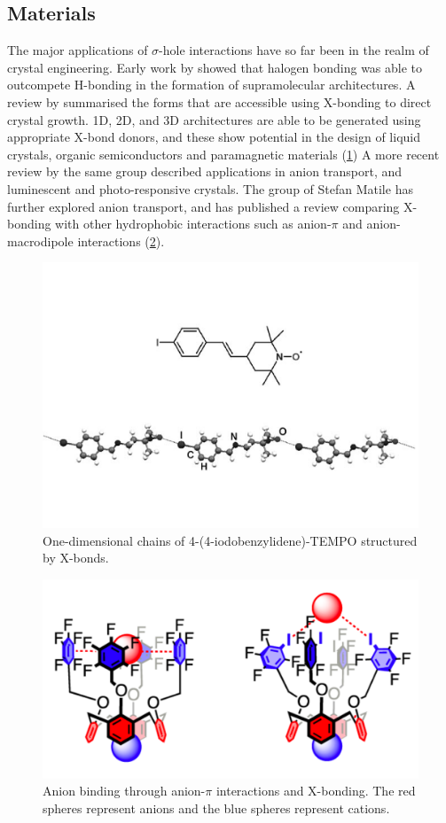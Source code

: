 \begin{refsection}
\subsection{Materials}
The major applications of $ \sigma $-hole interactions have so far been in the realm of crystal engineering.
Early work by \citeauthor{Corradi2000} showed that halogen bonding was able to outcompete H-bonding in the formation of supramolecular architectures.\autocite{Corradi2000}
A review by \citeauthor{Metrangolo2008} summarised the forms that are accessible using X-bonding to direct crystal growth.\autocite{Metrangolo2008}
1D, 2D, and 3D architectures are able to be generated using appropriate X-bond donors, and these show potential in the design of liquid crystals, organic semiconductors and paramagnetic materials (\cref{fig:iodotempo-chains})
A more recent review by the same group described applications in anion transport, and luminescent and photo-responsive crystals.\autocite{Priimagi2013}
The group of Stefan Matile has further explored anion transport, and has published a review comparing X-bonding with other hydrophobic interactions such as anion-$ \pi $ and anion-macrodipole interactions (\cref{fig:matile-anion-binder}).\autocite{VargasJentzsch2013}

\begin{figure}
    \centering
    \includegraphics[width=0.6\linewidth]{Figures/iodotempo-chains.pdf}
    \caption[One-dimensional chains of 4-(4-iodobenzylidene)-TEMPO structured by X-bonds.]{One-dimensional chains of 4-(4-iodobenzylidene)-TEMPO structured by X-bonds.\autocite{Metrangolo2008}}\label{fig:iodotempo-chains}
\end{figure}

\begin{figure}
    \centering
    \includegraphics[width=0.4\linewidth]{Figures/matile-anion-binder.pdf}
    \caption[Anion binding through anion-$ \pi $ interactions and X-bonding.]{Anion binding through anion-$ \pi $ interactions and X-bonding.\autocite{VargasJentzsch2013} The red spheres represent anions and the blue spheres represent cations.}\label{fig:matile-anion-binder}
\end{figure}


\end{refsection}
